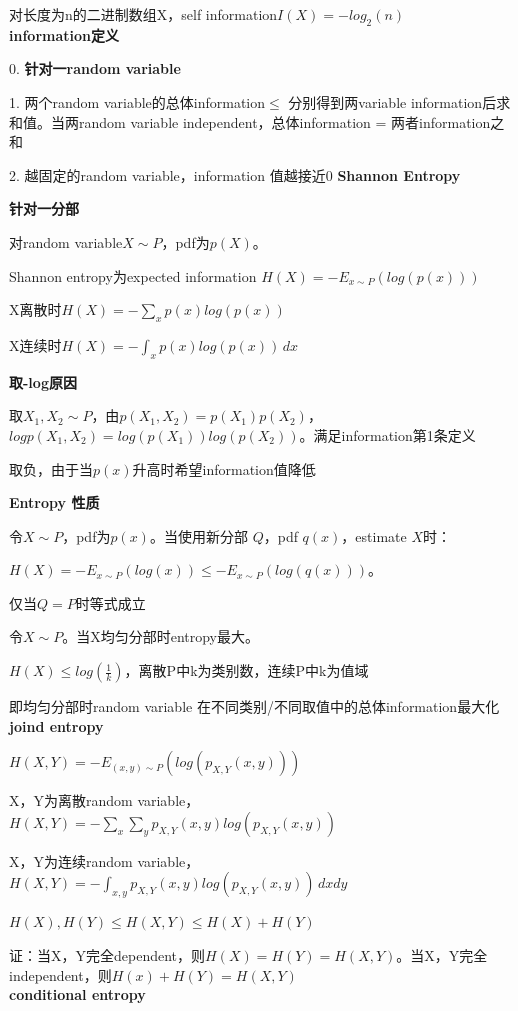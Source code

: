 \documentclass[UTF8]{ctexart}
\begin{document}
  对长度为n的二进制数组X，self information$I(X) = -log_2(n)$\\
\textbf{information定义}

  0. \textbf{针对一random variable}

  1. 两个random variable的总体information$\leq$ 分别得到两variable information后求和值。当两random variable independent，总体information = 两者information之和

  2. 越固定的random variable，information 值越接近0
\textbf{Shannon Entropy}

  \textbf{针对一分部}

  对random variable$X \sim P$，pdf为$p(X)$。
  
  Shannon entropy为expected information $H(X) = -E_{x \sim P}(log(p(x)))$

  \quad X离散时$H(X) = - \sum_{x} p(x)log(p(x))$

  \quad X连续时$H(X) = -\int_{x} p(x)log(p(x)) \,dx $
  
  \textbf{取-log原因}
  
  \quad 取$X_1, X_2 \sim P$，由$p(X_1, X_2) = p(X_1)p(X_2)$，$logp(X_1, X_2) = log(p(X_1))log(p(X_2))$。满足information第1条定义
  
  \quad 取负，由于当$p(x)$升高时希望information值降低

  \textbf{Entropy 性质}

  \quad 令$X \sim P$，pdf为$p(x)$。当使用新分部 $Q$，pdf $q(x)$，estimate $X$时：

  \quad \quad $H(X) = -E_{x \sim P}(log(x)) \leq -E_{x \sim P}(log(q(x)))$。

  \quad \quad 仅当$Q = P$时等式成立

  \quad 令$X \sim P$。当X均匀分部时entropy最大。

  \quad \quad $H(X) \leq log(\frac{1}{k})$，离散P中k为类别数，连续P中k为值域

  \quad \quad 即均匀分部时random variable 在不同类别/不同取值中的总体information最大化\\
\textbf{joind entropy}

  $H(X, Y) = -E_{(x, y) \sim P}(log(p_{X, Y}(x, y)))$

  X，Y为离散random variable，$H(X, Y) = -\sum_x\sum_yp_{X, Y}(x, y)log(p_{X, Y}(x, y))$

  X，Y为连续random variable，$H(X, Y) = -\int_{x, y} p_{X, Y}(x, y)log(p_{X, Y}(x, y)) \,dxdy$

  $H(X), H(Y) \leq H(X, Y) \leq H(X) + H(Y)$
  
  \quad 证：当X，Y完全dependent，则$H(X) = H(Y) = H(X, Y)$。当X，Y完全independent，则$H(x) + H(Y) = H(X, Y)$\\
\textbf{conditional entropy}
\end{document}
